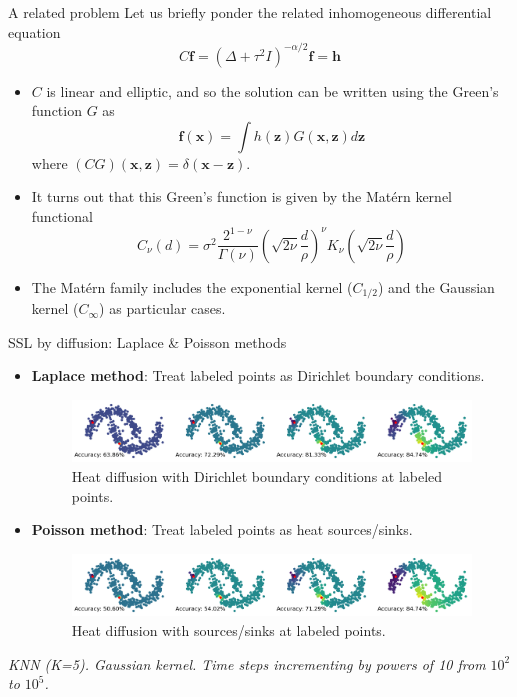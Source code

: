 \documentclass[9pt]{beamer}
\begin{document}

\begin{frame}{A related problem}
  Let us briefly ponder the related inhomogeneous differential equation $$C \mathbf f = \left( \Delta + \tau^2 I \right)^{-\alpha/2} \mathbf f= \mathbf h$$
  \begin{itemize}
    \item $C$ is linear and elliptic, and so the solution can be written using the Green's function $G$ as $$\mathbf f(\mathbf x) = \int h(\mathbf z) G(\mathbf x, \mathbf z) d \mathbf z$$ where $(CG)(\mathbf x, \mathbf z) = \delta(\mathbf x - \mathbf z)$.
    \item It turns out that this Green's function is given by the Matérn kernel functional $$C_\nu (d) = \sigma^2 \frac{2^{1-\nu}}{\Gamma(\nu)}\left( \sqrt{2\nu} \frac{d}{\rho} \right)^\nu K_\nu \left( \sqrt{2 \nu} \frac{d}{\rho}\right)$$
    \item The Matérn family includes the exponential kernel ($C_{1/2}$) and the Gaussian kernel ($C_\infty$) as particular cases. 
  \end{itemize}
\end{frame}


\begin{frame}{SSL by diffusion: Laplace \& Poisson methods}
  \begin{itemize}
    \item \textbf{Laplace method}: Treat labeled points as Dirichlet boundary conditions. 
    \begin{figure}[h!]
      \centering
      \includegraphics[width=11cm]{LaplaceSSL.png} %
      \caption{Heat diffusion with Dirichlet boundary conditions at labeled points.}
    \end{figure}
    \item \textbf{Poisson method}: Treat labeled points as heat sources/sinks.
    \begin{figure}[h!]
      \centering
      \includegraphics[width=11cm]{PoissonSSL.png} %
      \caption{Heat diffusion with sources/sinks at labeled points.}
    \end{figure}
  \end{itemize}
  \small{\textit{KNN (K=5). Gaussian kernel. Time steps incrementing by powers of 10 from $10^2$ to $10^5$.}}
\end{frame}
\end{document}
